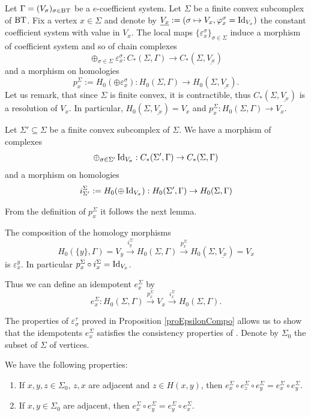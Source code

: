 \documentclass[a4paper,10pt]{amsart}
\begin{document}
\bigskip


Let $\Gamma=(V_\sigma)_{\sigma \in \bt}$ be a $e$-coefficient system. Let $\Sigma$ be a finite convex subcomplex of $\bt$. Fix a vertex $x \in \Sigma$ and denote by $\underline{V_x}:=(\sigma \mapsto V_x, \varphi_x^\sigma=\operatorname{Id}_{V_x})$ the constant coefficient system with value in $V_x$. The local maps $\{ \varepsilon_x^\sigma\}_{\sigma \in \Sigma}$ induce a morphism of coefficient system and so of chain complexes
\[
	\oplus_{\sigma \in \Sigma} \varepsilon_x^\sigma : C_{*}(\Sigma,\Gamma) \to C_{*}(\Sigma,\underline{V_x})
\]
and a morphism on homologies
\[
	p_x^\Sigma := H_0(\oplus \varepsilon_x^\sigma) : H_0(\Sigma,\Gamma) \to H_0(\Sigma, \underline{V_x}).
\]
Let us remark, that since $\Sigma$ is finite convex, it is contractible, thus $C_{*}(\Sigma,\underline{V_x})$ is a resolution of $V_x$. In particular, $H_0(\Sigma, \underline{V_x})=V_x$ and $p_x^\Sigma : H_0(\Sigma,\Gamma) \to V_x$.

\medskip

Let $\Sigma' \subseteq \Sigma$ be a finite convex subcomplex of $\Sigma$. We have a morphism of complexes
\[
	\oplus_{\sigma \in \Sigma'} \operatorname{Id}_{V_\sigma} : C_{*}(\Sigma',\Gamma) \to C_{*}(\Sigma,\Gamma)
\]
and a morphism on homologies
\[
	i_{\Sigma'}^\Sigma := H_0(\oplus \operatorname{Id}_{V_\sigma}) : H_0(\Sigma',\Gamma) \to H_0(\Sigma,\Gamma)
\]

\medskip

From the definition of $p_x^\Sigma$ it follows the next lemma.
\begin{Lem}
	\label{lemipcompo}
	The composition of the homology morphisms
	\[
		H_0(\{y\},\Gamma)=V_y \overset{i_{y}^\Sigma}{\longrightarrow} H_0(\Sigma,\Gamma) \overset{p_{x}^\Sigma}{\longrightarrow} H_0(\Sigma, \underline{V_x})=V_x
	\]
	is $\varepsilon_x^y$. In particular $p_x^\Sigma \circ i_x^\Sigma=\operatorname{Id}_{V_x}$.
\end{Lem}

Thus we can define an idempotent $e_x^\Sigma$ by
\[
	e_x^\Sigma: H_0(\Sigma,\Gamma) \overset{p_{x}^\Sigma}{\longrightarrow} V_x \overset{i_{x}^\Sigma}{\longrightarrow} H_0(\Sigma,\Gamma).
\]



The properties of $\varepsilon_\sigma^\tau$ proved in Proposition \ref{proEpsilonCompo} allows us to show that the idempotents $e_x^\Sigma$ satisfies the consistency properties of \cite{meyer_resolutions_2010}. Denote by $\Sigma_0$ the subset of $\Sigma$ of vertices.

\begin{Pro}
	\label{prosystconst}
	We have the following properties:
	\begin{enumerate}
		\item If $x,y,z \in \Sigma_0$, $z,x$ are adjacent and $z \in H(x,y)$, then $e_x^\Sigma \circ e_z^\Sigma \circ e_y^\Sigma = e_x^\Sigma \circ e_y^\Sigma$.
		\item If $x,y \in\Sigma_0$ are adjacent, then $e_x^\Sigma \circ e_y^\Sigma =e_y^\Sigma \circ e_x^\Sigma$.	
	\end{enumerate}
\end{Pro}
\end{document}
